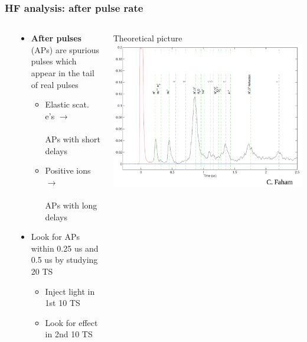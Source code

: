 \documentclass[bigger]{beamer}
\providecommand{\alert}[1]{\textbf{#1}}
\begin{document}
\begin{frame}
\frametitle{HF analysis: after pulse rate}
\label{sec-3-2-4}
\begin{columns} %
\label{sec-3-2-4-1}
\begin{column}{0.60\textwidth}
\label{sec-3-2-4-1-1}
\begin{itemize}

\item \alert{After pulses} (APs) are spurious pulses which appear in the tail of real pulses
\label{sec-3-2-4-1-1-1}%
\begin{itemize}

\item Elastic scat. e's $\to$ \\\\
\label{sec-3-2-4-1-1-1-1}%
APs with short delays

\item Positive ions $\to$ \\\\
\label{sec-3-2-4-1-1-1-2}%
APs with long delays
\end{itemize} %

\item Look for APs within 0.25 us and 0.5 us by studying 20 TS
\label{sec-3-2-4-1-1-2}%
\begin{itemize}

\item Inject light in 1st 10 TS
\label{sec-3-2-4-1-1-2-1}%

\item Look for effect in 2nd 10 TS
\label{sec-3-2-4-1-1-2-2}%
\end{itemize} %
\end{itemize} %
\end{column}
\begin{column}{0.50\textwidth}
\label{sec-3-2-4-1-2}

\centering
Theoretical picture
\includegraphics[width=\textwidth]{fig/hf_local/after_pulse_intro.png}
\end{column}
\end{columns}
\end{frame}
\end{document}
